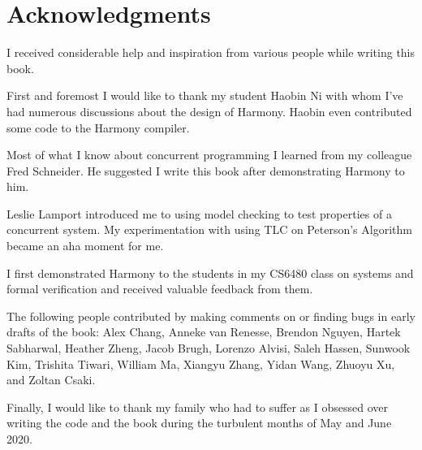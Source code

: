 \documentclass{report}
\begin{document}
\cleardoublepage
{}
{}
\chapter*{Acknowledgments}

I received considerable help and inspiration from various people
while writing this book.

First and foremost I would like to thank my student Haobin Ni with
whom I've had numerous discussions about the design of Harmony.
Haobin even contributed some code to the Harmony compiler.

Most of what I know about concurrent programming I learned from
my colleague Fred Schneider.  He suggested I write this book after
demonstrating Harmony to him.

Leslie Lamport introduced me to using model checking to test properties
of a concurrent system.  My experimentation with using TLC on Peterson's
Algorithm became an aha moment for me.

I first demonstrated Harmony to the students in my CS6480 class on systems
and formal verification and
received valuable feedback from them.

The following people contributed by making comments on or finding bugs in
early drafts of the book:
Alex Chang,
Anneke van Renesse,
Brendon Nguyen,
Hartek Sabharwal,
Heather Zheng,
Jacob Brugh,
Lorenzo Alvisi,
Saleh Hassen,
Sunwook Kim,
Trishita Tiwari,
William Ma,
Xiangyu Zhang,
Yidan Wang,
Zhuoyu Xu,
and
Zoltan Csaki.

Finally, I would like to thank my family who had to suffer as I obsessed
over writing the code and the book during the turbulent months of
May and June 2020.


\cleardoublepage
{}
\printindex

\cleardoublepage
{}
\printglossaries
\end{document}

